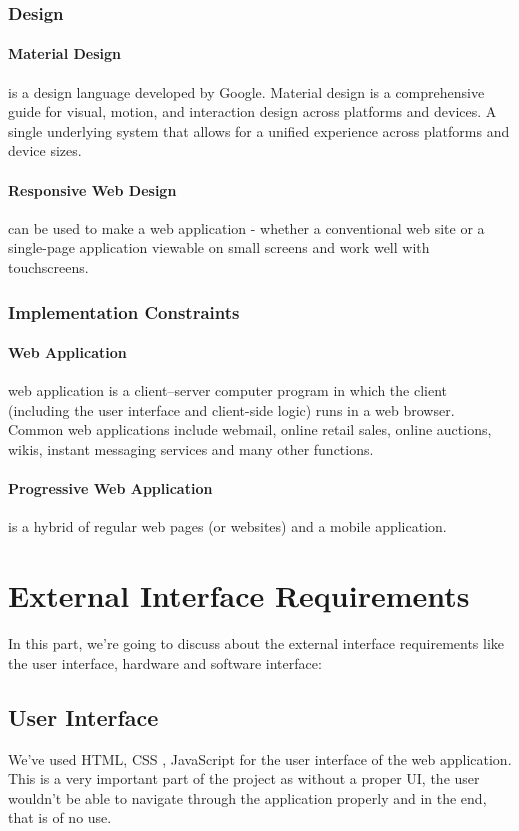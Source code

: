 \documentclass[BTech]{srmuthesis}
\begin{document}
\subsubsection{Design}
\paragraph{Material Design} is a design language developed by Google. Material design is a comprehensive guide for visual, motion, and interaction design across platforms and devices. A single underlying system that allows for a unified experience across platforms and device sizes.
\paragraph{Responsive Web Design}
can be used to make a web application - whether a conventional web site or a single-page application viewable on small screens and work well with touchscreens.
\subsubsection{Implementation Constraints}
\paragraph{Web Application}
web application is a client–server computer program in which the client (including the user interface and client-side logic) runs in a web browser. Common web applications include webmail, online retail sales, online auctions, wikis, instant messaging services and many other functions.
\paragraph{Progressive Web Application} is a hybrid of regular web pages (or websites) and a mobile application.
\section{External Interface Requirements}
In this part, we're going to discuss about the external interface requirements like the user interface, hardware and software interface:
\subsection{User Interface}
We've used HTML, CSS , JavaScript for the user interface of the web application. This is a very important part of the project as without a proper UI, the user wouldn't be able to navigate through the application properly and in the end, that is of no use.
\end{document}
